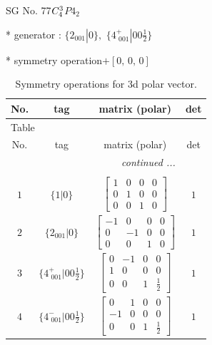 \documentclass[fleqn,8pt]{jsarticle}
\begin{document}
\setcounter{MaxMatrixCols}{32}

\renewcommand{\tablename}{Table~}
\renewcommand{\figurename}{Figure~}
\begin{center}
\LARGE
SG No. 77\quad$C_{\rm 4}^{3}$\quad$P4_2$\quad[ tetragonal ]
\end{center}

* generator : $\{2{}_{001}|0\},\,\,\{4^{+}_{\,\,001}|0 0 \frac{1}{2}\}$

* symmetry operation\quad$+\left[ 0,\, 0,\, 0 \right]$
\renewcommand{\arraystretch}{1.3}
\begin{longtable}{cccc}
\caption{Symmetry operations for 3d polar vector.}
 \\
 \hline \hline
No. & tag & matrix (polar) & det \\ \hline \endfirsthead

\multicolumn{3}{l}{\tablename\ \thetable{}} \\
 \hline \hline
No. & tag & matrix (polar) & det \\ \hline \endhead

 \hline \hline
\multicolumn{3}{r}{\footnotesize\it continued ...} \\ \endfoot

 \hline \hline
\multicolumn{3}{r}{} \\ \endlastfoot

$ 1 $ & $ \{1|0\} $ & $ \begin{bmatrix} 1 & 0 & 0 & 0 \\ 0 & 1 & 0 & 0 \\ 0 & 0 & 1 & 0 \end{bmatrix} $ & $ 1 $ \\ \hline
$ 2 $ & $ \{2{}_{001}|0\} $ & $ \begin{bmatrix} -1 & 0 & 0 & 0 \\ 0 & -1 & 0 & 0 \\ 0 & 0 & 1 & 0 \end{bmatrix} $ & $ 1 $ \\ \hline
$ 3 $ & $ \{4^{+}_{\,\,001}|0 0 \frac{1}{2}\} $ & $ \begin{bmatrix} 0 & -1 & 0 & 0 \\ 1 & 0 & 0 & 0 \\ 0 & 0 & 1 & \frac{1}{2} \end{bmatrix} $ & $ 1 $ \\ \hline
$ 4 $ & $ \{4^{-}_{\,\,001}|0 0 \frac{1}{2}\} $ & $ \begin{bmatrix} 0 & 1 & 0 & 0 \\ -1 & 0 & 0 & 0 \\ 0 & 0 & 1 & \frac{1}{2} \end{bmatrix} $ & $ 1 $ \\
\end{longtable}
\end{document}
